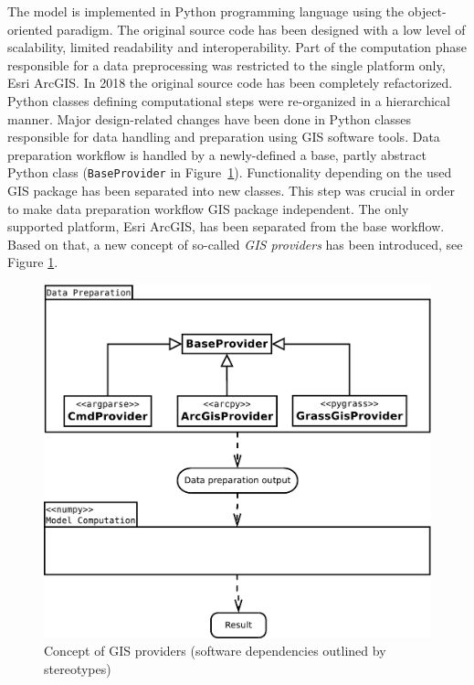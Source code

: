 The model is implemented in Python programming language using the
object-oriented paradigm. The original source code has been designed
with a low level of scalability, limited readability and
interoperability. Part of the computation phase responsible for a data
preprocessing was restricted to the single platform only, Esri ArcGIS. In
2018 the original source code has been completely refactorized. Python
classes defining computational steps were re-organized in a
hierarchical manner. Major design-related changes have been done in
Python classes responsible for data handling and preparation using GIS
software tools. Data preparation workflow is handled by a
newly-defined a base, partly abstract Python class ({\tt BaseProvider}
in Figure~\ref{fig:uml_diagram}). Functionality depending on the used
GIS package has been separated into new classes. This step was crucial
in order to make data preparation workflow GIS package
independent. The only supported platform, Esri ArcGIS, has been
separated from the base workflow. Based on that, a new concept of
so-called {\em GIS providers} has been introduced, see
Figure \ref{fig:uml_diagram}. 

\begin{figure}[ht!]
  \begin{center}
    \includegraphics[width=0.9\columnwidth]{figures/uml_diagram.pdf}
    \caption{Concept of GIS providers (software dependencies outlined by stereotypes)}
    \label{fig:uml_diagram}
  \end{center}
\end{figure}

